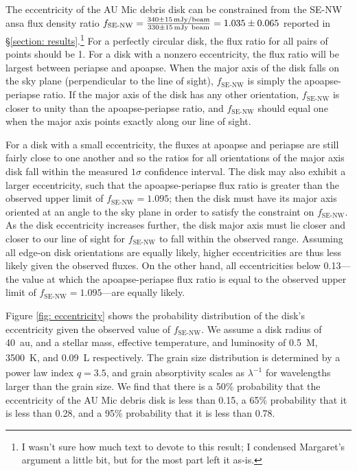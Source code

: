 \documentclass[modern]{aastex62}
\begin{document}
The eccentricity of the AU Mic debris disk can be constrained from the SE-NW ansa flux density ratio $f_{\text{SE-NW}} = \frac{\SI{340 \pm 15}{mJy / beam}}{\SI{330 \pm 15}{mJy \ beam}} = \num{1.035 \pm 0.065}$ reported in \S \ref{section: results}.\footnote{I wasn't sure how much text to devote to this result; I condensed Margaret's argument a little bit, but for the most part left it as-is.}
For a perfectly circular disk, the flux ratio for all pairs of points should be 1. 
For a disk with a nonzero eccentricity, the flux ratio will be largest between periapse and apoapse. 
When the major axis of the disk falls on the sky plane (perpendicular to the line of sight), $f_{\text{SE-NW}}$ is simply the apoapse-periapse ratio. 
If the major axis of the disk has any other orientation, $f_{\text{SE-NW}}$ is closer to unity than the apoapse-periapse ratio, and $f_{\text{SE-NW}}$ should equal one when the major axis points exactly along our line of sight.

For a disk with a small eccentricity, the fluxes at apoapse and periapse are still fairly close to one another and so the ratios for all orientations of the major axis disk fall within the measured $1\sigma$ confidence interval. 
The disk may also exhibit a larger eccentricity, such that the apoapse-periapse flux ratio is greater than the observed upper limit of $f_{\text{SE-NW}}=1.095$; then the disk must have its major axis oriented at an angle to the sky plane in order to satisfy the constraint on $f_{\text{SE-NW}}$. 
As the disk eccentricity increases further, the disk major axis must lie closer and closer to our line of sight for $f_{\text{SE-NW}}$ to fall within the observed range.
Assuming all edge-on disk orientations are equally likely, higher eccentricities are thus less likely given the observed fluxes. 
On the other hand, all eccentricities below 0.13---the value at which the apoapse-periapse flux ratio is equal to the observed upper limit of $f_{\text{SE-NW}}=1.095$---are equally likely. 

Figure \ref{fig: eccentricity} shows the probability distribution of the disk's eccentricity given the observed value of $f_{\text{SE-NW}}$.
We assume a disk radius of \SI{40}{au}, and a stellar mass, effective temperature, and luminosity of \SI{0.5}{M_\sun}, \SI{3500}{K}, and \SI{0.09}{L_\sun} respectively. 
The grain size distribution is determined by a power law index $q=3.5$, and grain absorptivity scales as $\lambda^{-1}$ for wavelengths larger than the grain size.
We find that there is a 50\% probability that the eccentricity of the AU Mic debris disk is less than 0.15, a 65\% probability that it is less than 0.28, and a 95\% probability that it is less than 0.78.
\end{document}

